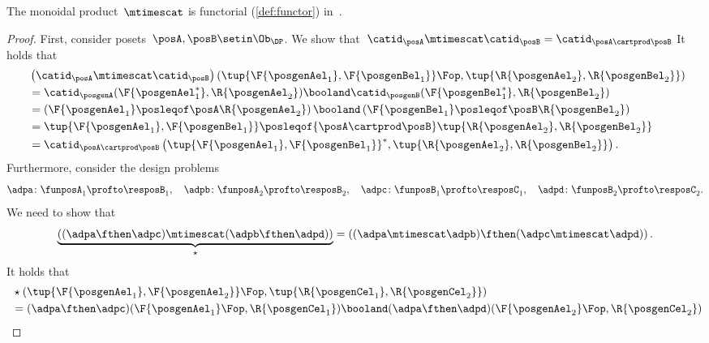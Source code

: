 \begin{lemma}
    \label{lem:monoidal_functorial}
    The monoidal product~$\mtimescat$ is functorial (\cref{def:functor}) in~\DP.
\end{lemma}
\begin{proof}
    First, consider posets~$\posA,\posB\setin \Ob_\DP$.
    We show that~$\catid_\posA\mtimescat \catid_\posB = \catid_{\posA\cartprod \posB}$
    It holds that
    \begin{equation}
        \begin{aligned}
            ~ & \left( \catid_{\posA}\mtimescat \catid_{\posB}\right)
            \left( \tup{\F{\posgenAel_1},\F{\posgenBel_1}}\Fop,\tup{\R{\posgenAel_2},\R{\posgenBel_2}}\right) \\
              & =
            \catid_\posgenA(\F{\posgenAel_1^*},\R{\posgenAel_2})\booland \catid_\posgenB(\F{\posgenBel_1^*},\R{\posgenBel_2}) \\
              & =\left( \F{\posgenAel_1}\posleqof\posA \R{\posgenAel_2}\right)\booland \left( \F{\posgenBel_1}\posleqof\posB \R{\posgenBel_2}\right) \\
              & =\tup{\F{\posgenAel_1},\F{\posgenBel_1}}\posleqof{\posA\cartprod \posB}\tup{\R{\posgenAel_2},\R{\posgenBel_2}} \\
              & =\catid_{\posA\cartprod \posB}\left( \tup{\F{\posgenAel_1},\F{\posgenBel_1}}^*,\tup{\R{\posgenAel_2},\R{\posgenBel_2}}\right).
        \end{aligned}
    \end{equation}
    Furthermore, consider the design problems
    \begin{equation*}
        \adpa\colon \funposA_1 \profto \resposB_1,\quad \adpb\colon \funposA_2\profto \resposB_2, \quad \adpc\colon \funposB_1\profto \resposC_1,\quad \adpd\colon \funposB_2\profto \resposC_2.
    \end{equation*}
    We need to show that
    \begin{equation}
        \underbrace{\left( (\adpa\fthen \adpc) \mtimescat (\adpb\fthen \adpd)\right)}_{\star}=\left( (\adpa\mtimescat \adpb)\fthen (\adpc\mtimescat \adpd)\right).
    \end{equation}
    It holds that
    \begin{equation}
        \begin{aligned}
            ~ & \star \left( \tup{\F{\posgenAel_1},\F{\posgenAel_2}}\Fop,\tup{\R{\posgenCel_1},\R{\posgenCel_2}}\right) \\
              & = (\adpa\fthen \adpc)(\F{\posgenAel_1}\Fop,\R{\posgenCel_1})\booland (\adpa\fthen \adpd)(\F{\posgenAel_2}\Fop,\R{\posgenCel_2}) \\

\end{aligned}
\end{equation}
\end{proof}
